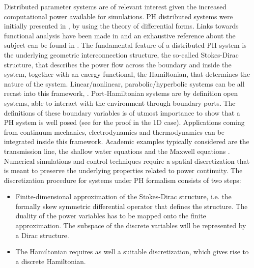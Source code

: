 \documentclass[11t]{article}
\begin{document}
	
	Distributed parameter systems are of relevant interest given the increased computational power available for simulations. PH distributed systems were initially presented in \cite{VANDERSCHAFT2002166}, by using the theory of differential forms. Links towards functional analysis have been made in \cite{Villegas} and an exhaustive reference about the subject can be found in \cite{BookZwart}. The fundamental feature of a distributed PH system is the underlying geometric interconnection structure, the so-called Stokes-Dirac structure, that describes the power flow across the boundary and inside the system, together with an energy functional, the Hamiltonian, that determines the nature of the system. Linear/nonlinear, parabolic/hyperbolic systems can be all recast into this framework, \cite{bookPHs}. Port-Hamiltonian systems are by definition open systems, able to interact with the environment through boundary ports. The definitions of these boundary variables is of utmost importance to show that a PH system is well posed (see \cite{LeGorrec2005} for the proof in the 1D case). Applications coming from continuum mechanics, electrodynamics and thermodynamics can be integrated inside this framework. Academic examples typically considered are the transmission line, the shallow water equations and the Maxwell equations \cite{VANDERSCHAFT2002166}. \\
	
	Numerical simulations and control techniques require a spatial discretization that is meant to preserve the underlying properties related to power continuity. The discretization procedure for systems under PH formalism consists of two steps:
	\begin{itemize}
		\item Finite-dimensional approximation of the Stokes-Dirac structure, i.e. the formally skew symmetric differential operator that defines the structure. The duality of the power variables has to be mapped onto the finite approximation. The subspace of the discrete variables will be represented by a Dirac structure. 
		\item The Hamiltonian requires as well a suitable discretization, which gives rise to a discrete Hamiltonian. 
	\end{itemize} 
	
\end{document}
